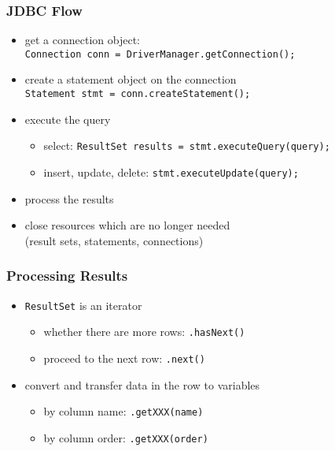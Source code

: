 \documentclass[dvipsnames]{beamer}
\theoremstyle{plain}
\begin{document}
\begin{frame}
  \frametitle{JDBC Flow}

  \begin{itemize}
    \item get a connection object:\\
    \lstinline!Connection conn = DriverManager.getConnection();!

    \pause
    \item create a statement object on the connection\\
    \lstinline!Statement stmt = conn.createStatement();!

    \pause
    \item execute the query
    \begin{itemize}
      \item select: \lstinline!ResultSet results = stmt.executeQuery(query);!
      \item insert, update, delete: \lstinline!stmt.executeUpdate(query);!
    \end{itemize}

    \pause
    \item process the results

    \pause
    \item close resources which are no longer needed\\
      (result sets, statements, connections)
  \end{itemize}
\end{frame}

\begin{frame}
  \frametitle{Processing Results}

  \begin{itemize}
    \item \lstinline!ResultSet! is an iterator
    \begin{itemize}
      \item whether there are more rows: \lstinline!.hasNext()!
      \item proceed to the next row: \lstinline!.next()!
    \end{itemize}

    \medskip
    \item convert and transfer data in the row to variables
    \begin{itemize}
      \item by column name: \lstinline!.getXXX(name)!
      \item by column order: \lstinline!.getXXX(order)!
    \end{itemize}
  \end{itemize}
\end{frame}
\end{document}
